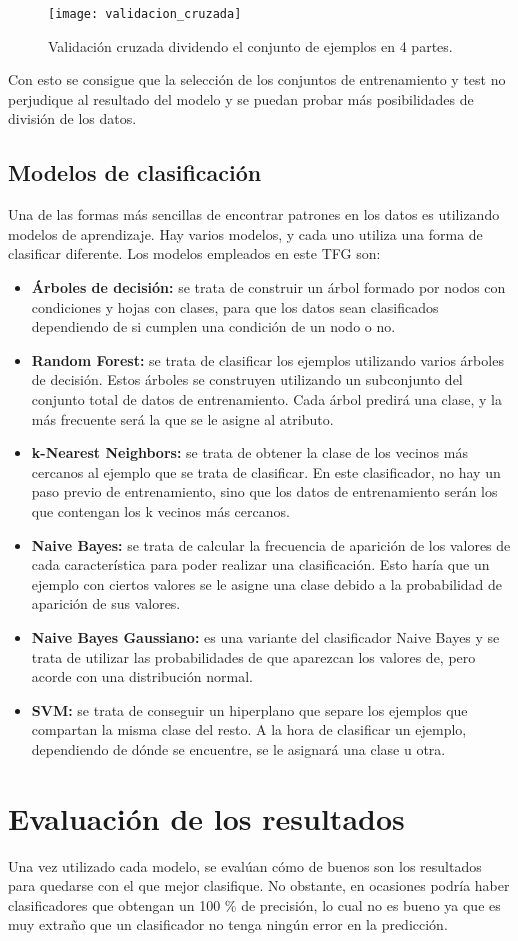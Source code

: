 \begin{figure}[h]
	\texttt{[image: validacion\_cruzada]}
	\caption{Validación cruzada dividendo el conjunto de ejemplos en 4 partes.\cite{wiki:valcruzada}}
	\label{fig:valcruzada}
\end{figure}

Con esto se consigue que la selección de los conjuntos de entrenamiento y test no perjudique al resultado del modelo y se puedan probar más posibilidades de división de los datos.

\subsection{Modelos de clasificación}
Una de las formas más sencillas de encontrar patrones en los datos es utilizando modelos de aprendizaje. Hay varios modelos, y cada uno utiliza una forma de clasificar diferente. Los modelos empleados en este TFG son:
\begin{itemize}
	\item \textbf{Árboles de decisión:} se trata de construir un árbol formado por nodos con condiciones y hojas con clases, para que los datos sean clasificados dependiendo de si cumplen una condición de un nodo o no.
	\item \textbf{Random Forest:} se trata de clasificar los ejemplos utilizando varios árboles de decisión. Estos árboles se construyen utilizando un subconjunto del conjunto total de datos de entrenamiento. Cada árbol predirá una clase, y la más frecuente será la que se le asigne al atributo.
	\item \textbf{k-Nearest Neighbors:} se trata de obtener la clase de los vecinos más cercanos al ejemplo que se trata de clasificar. En este clasificador, no hay un paso previo de entrenamiento, sino que los datos de entrenamiento serán los que contengan los k vecinos más cercanos.
	\item \textbf{Naive Bayes:} se trata de calcular la frecuencia de aparición de los valores de cada característica para poder realizar una clasificación. Esto haría que 
	un ejemplo con ciertos valores se le asigne una clase debido a la probabilidad de aparición de sus valores.
	\item \textbf{Naive Bayes Gaussiano:} es una variante del clasificador Naive Bayes y se trata de utilizar las probabilidades de que aparezcan los valores de, pero acorde con una distribución normal.
	\item \textbf{SVM:} se trata de conseguir un hiperplano que separe los ejemplos que compartan la misma clase del resto. A la hora de clasificar un ejemplo, dependiendo de dónde se encuentre, se le asignará una clase u otra.
\end{itemize}

\section{Evaluación de los resultados}
Una vez utilizado cada modelo, se evalúan cómo de buenos son los resultados para quedarse con el que mejor clasifique. No obstante, en ocasiones podría haber clasificadores que obtengan un 100 \% de precisión, lo cual no es bueno ya que es muy extraño que un clasificador no tenga ningún error en la predicción.
